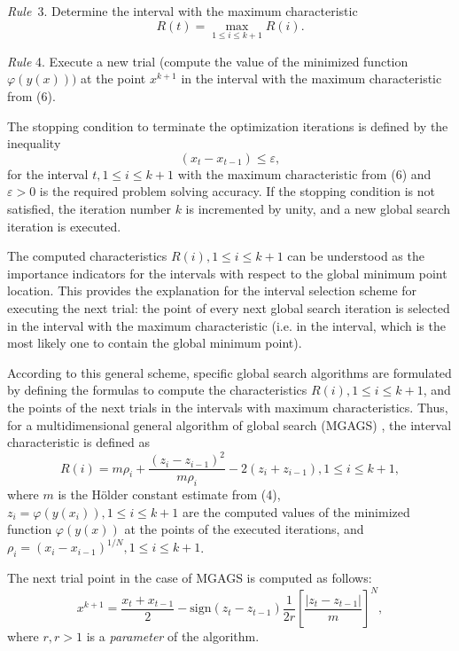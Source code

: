 \documentclass[12pt]{amsart}
\begin{document}
\textit{Rule}~3. Determine the interval with the maximum characteristic
\begin{equation}
R(t) = \max_{1 \leq i \leq k + 1}R(i).
\end{equation}

\textit{Rule} 4. Execute a new trial (compute the value of the minimized function $\varphi(y(x)))$ at the point $x^{k+1}$ in the interval with the maximum characteristic from (6).

The stopping condition to terminate the optimization iterations is defined by the inequality
\begin{equation}
(x_t - x_{t-1}) \leq \varepsilon,
\end{equation}
for the interval $t, 1 \leq i \leq k + 1$ with the maximum characteristic from (6) and $\varepsilon > 0$ is the required problem solving accuracy. If the stopping condition is not satisfied, the iteration number $k$ is incremented by unity, and a new global search iteration is executed.

The computed characteristics $R(i), 1 \leq i \leq k + 1$ can be understood as the importance indicators for the intervals with respect to the global minimum point location. This provides the explanation for the interval selection scheme for executing the next trial: the point of every next global search iteration is selected in the interval with the maximum characteristic (i.e. in the interval, which is the most likely one to contain the global minimum point).

According to this general scheme, specific global search algorithms are formulated by defining the formulas to compute the characteristics $R(i), 1 \leq i \leq k+1$, and the points of the next trials in the intervals with maximum characteristics. Thus, for a multidimensional general algorithm of global search (MGAGS) \cite{Strongin1}, the interval characteristic is defined as
\begin{equation}
R(i)=m\rho_i+\frac{(z_i-z_{i-1})^2}{m\rho_i}-2 (z_i + z_{i-1}), 1 \leq i \leq k + 1,
\end{equation}
where $m$ is the H\"older constant estimate from (4), $z_i = \varphi(y(x_i)), 1 \leq i \leq k + 1$ are the computed values of the minimized function $\varphi(y(x))$ at the points of the executed iterations, and $\rho_i = \left(x_i - x_{i-1} \right)^{1/N}, 1 \leq i \leq k + 1$.

The next trial point in the case of MGAGS is computed as follows:
\begin{equation}
x^{k+1} = \frac{x_t+x_{t-1}}{2} - \mathrm{sign}(z_t-z_{t-1})\frac{1}{2r}\left[\frac{\left|z_t-z_{t-1}\right|}{m}\right]^N,
\end{equation}
where $r, r > 1$ is a \textit{parameter} of the algorithm.
\end{document}
